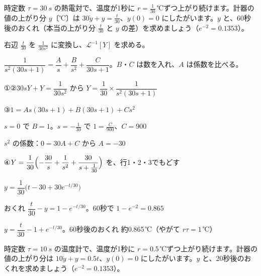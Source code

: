 \begin{reidai}[熱電対のおくれ]
時定数 $\tau=\qty{30}{s}$ の熱電対で、温度が1秒に $r=\frac{1}{30}$\,℃ずつ上がり続けます。計器の値の上がり分 $y$〔℃〕は $30\dot y+y=\frac{t}{30}$、$y(0)=0$ にしたがいます。$y$ と、60秒後のおくれ（本当の上がり分 $\frac{t}{30}$ と $y$ の差）を求めましょう（$e^{-2}=0.1353$）。\par
\kangaekata {}\par
{}\enspace 右辺 $\frac{t}{30}$ を $\frac{1}{30s^2}$ に変換し、$\mathcal L^{-1}[Y]$ を求める。\par
{}\enspace $\dfrac{1}{s^2(30s+1)}=\dfrac{A}{s}+\dfrac{B}{s^2}+\dfrac{C}{30s+1}$。$B$・$C$ は数を入れ、$A$ は係数を比べる。\par
\shiki\kixhs{}\zw{} ①②\enspace $30sY+Y=\dfrac{1}{30s^2}$ から $Y=\dfrac{1}{30}\times\dfrac{1}{s^2(30s+1)}$\par
\kixha ③\enspace $1=As(30s+1)+B(30s+1)+Cs^2$\par
\kixhb $s=0$ で $B=1$。$s=-\frac{1}{30}$ で $1=\frac{C}{900}$、$C=900$\par
\kixhb $s^2$ の係数：$0=30A+C$ から $A=-30$\par
\kixha ④\enspace $Y=\dfrac{1}{30}\Bigl(-\dfrac{30}{s}+\dfrac{1}{s^2}+\dfrac{30}{s+\frac{1}{30}}\Bigr)$ を、行1・2・3でもどす\par
\kixha $y=\dfrac{1}{30}\bigl(t-30+30e^{-t/30}\bigr)$\par
\kixha おくれ $\dfrac{t}{30}-y=1-e^{-t/30}$。60秒で $1-e^{-2}=0.865$\par
\kotae $y=\dfrac{t}{30}-1+e^{-t/30}$。60秒後のおくれ 約0.865\,℃（やがて $r\tau=1$\,℃）
\end{reidai}

\begin{jibun}
時定数 $\tau=\qty{10}{s}$ の温度計で、温度が1秒に $r=0.5$\,℃ずつ上がり続けます。計器の値の上がり分は $10\dot y+y=0.5t$、$y(0)=0$ にしたがいます。$y$ と、20秒後のおくれを求めましょう（$e^{-2}=0.1353$）。
\end{jibun}


